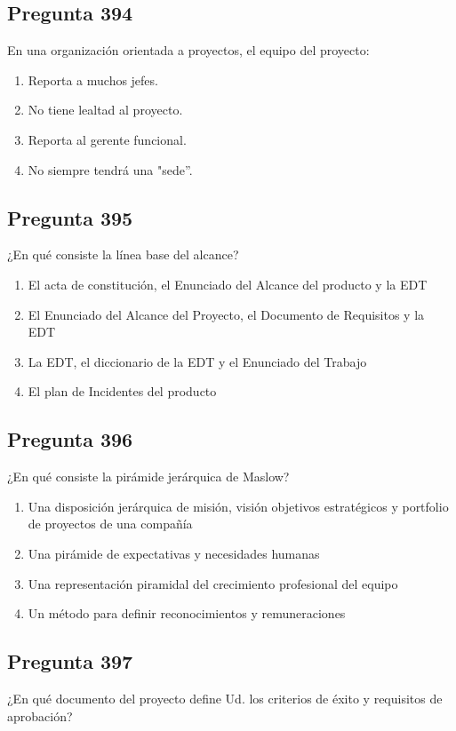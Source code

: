 \documentclass[11pt,a4paper]{article}
\begin{document}
\subsection*{Pregunta 394}
En una organización orientada a proyectos, el equipo del proyecto:

\begin{enumerate}[label=\alph*)]
  \item Reporta a muchos jefes.
  \item No tiene lealtad al proyecto.
  \item Reporta al gerente funcional.
  \item No siempre tendrá una "sede''.
\end{enumerate}

\subsection*{Pregunta 395}
¿En qué consiste la línea base del alcance?

\begin{enumerate}[label=\alph*)]
  \item El acta de constitución, el Enunciado del Alcance del producto y la EDT
  \item El Enunciado del Alcance del Proyecto, el Documento de Requisitos y la EDT
  \item La EDT, el diccionario de la EDT y el Enunciado del Trabajo
  \item El plan de Incidentes del producto
\end{enumerate}

\subsection*{Pregunta 396}
¿En qué consiste la pirámide jerárquica de Maslow?

\begin{enumerate}[label=\alph*)]
  \item Una disposición jerárquica de misión, visión objetivos estratégicos y portfolio de proyectos de una compañía
  \item Una pirámide de expectativas y necesidades humanas
  \item Una representación piramidal del crecimiento profesional del equipo
  \item Un método para definir reconocimientos y remuneraciones
\end{enumerate}

\subsection*{Pregunta 397}
¿En qué documento del proyecto define Ud. los criterios de éxito y requisitos de aprobación?
\end{document}

